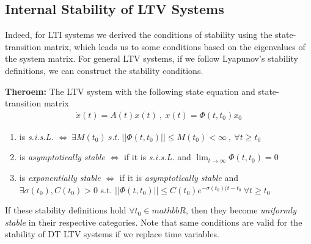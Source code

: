 \documentclass[twoside]{article}
\begin{document}
\subsection{Internal Stability of LTV Systems}

Indeed, for LTI systems we derived the conditions of stability using the state-transition matrix, 
which leads us to some conditions based on the eigenvalues of the system matrix. For general LTV systems,
if we follow Lyapunov's stability definitions, we can construct the stability conditions.

\textbf{Theroem:} The LTV system with the following state equation and state-transition matrix
%
\begin{align*}
 \dot{x}(t) = A(t) x(t) \ , \ x(t) = \Phi(t,t_0) x_0
\end{align*}
%
\begin{enumerate}
\item is \textit{s.i.s.L.} $\iff \ \exists M(t_0) \ s.t. \ || \Phi(t,t_0) || \leq M(t_0) < \infty \ , \ \forall t \geq t_0$
\item is \textit{asymptotically stable} $\iff$ if it is \textit{s.i.s.L.} and $ \lim_{t \to \infty} \Phi(t,t_0) = 0$
\item is \textit{exponentially stable} $\iff$ if it is \textit{asymptotically stable} and 
$ \exists \sigma(t_0) , C(t_0) > 0 $ s.t. $ || \Phi(t,t_0) || \leq C(t_0) e^{-\sigma(t_0) (t - t_0} \ \forall t \geq t_0$
\end{enumerate}
% 
If these stability definitions hold $\forall t_0 \in mathbb{R}$, then they become \textit{uniformly stable} in their respective 
categories. Note that same conditions are valid for the stability of DT LTV systems if we replace time variables. 




\end{document}
